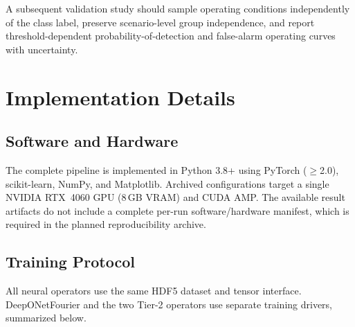 \documentclass[journal]{IEEEtran}
\newcommand{\added}[1]{#1}
\begin{document}
\added{A subsequent validation study should sample operating conditions independently of the class label, preserve scenario-level group independence, and report threshold-dependent probability-of-detection and false-alarm operating curves with uncertainty.}

\section{Implementation Details}
\label{sec:impl}

\subsection{Software and Hardware}

The complete pipeline is implemented in Python 3.8+ using PyTorch ($\geq$2.0), scikit-learn, NumPy, and Matplotlib. Archived configurations target a single NVIDIA RTX~4060 GPU (8\,GB VRAM) and CUDA AMP. \added{The available result artifacts do not include a complete per-run software/hardware manifest, which is required in the planned reproducibility archive.}

\subsection{Training Protocol}

All neural operators use the same HDF5 dataset and tensor interface. DeepONetFourier and the two Tier-2 operators use separate training drivers, summarized below.
\end{document}
